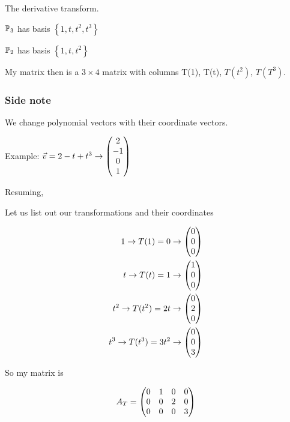 \documentclass[a4paper]{article}
\begin{document}
The derivative transform.

$\P_3$ has basis $\left\{ 1, t, t^2, t^3 \right\}$

$\P_2$ has basis $\left\{ 1, t, t^2 \right\}$

My matrix then is a $3 \times 4$ matrix with columns T(1), T(t), $T(t^2)$, $T(T^3)$.

\subsubsection{Side note}
We change polynomial vectors with their coordinate vectors.

Example: $\vec{v} = 2 - t + t^3 \to \genericmat{p}{2 \\ -1 \\ 0 \\ 1}$

Resuming,

Let us list out our transformations and their coordinates

\[
	\begin{aligned}
		1 \to T(1) = 0 \to \genericmat{p}{0\\0\\0} \\
		t \to T(t) = 1 \to \genericmat{p}{1\\0\\0} \\
		t^2 \to T(t^2) = 2t \to \genericmat{p}{0\\2\\0} \\
		t^3 \to T(t^3) = 3t^2 \to \genericmat{p}{0\\0\\3} \\
	\end{aligned}
\]

So my matrix is 

\[A_T = \genericmat{p}{0&1&0&0 \\ 0&0&2&0 \\ 0&0&0&3}\]
\end{document}
